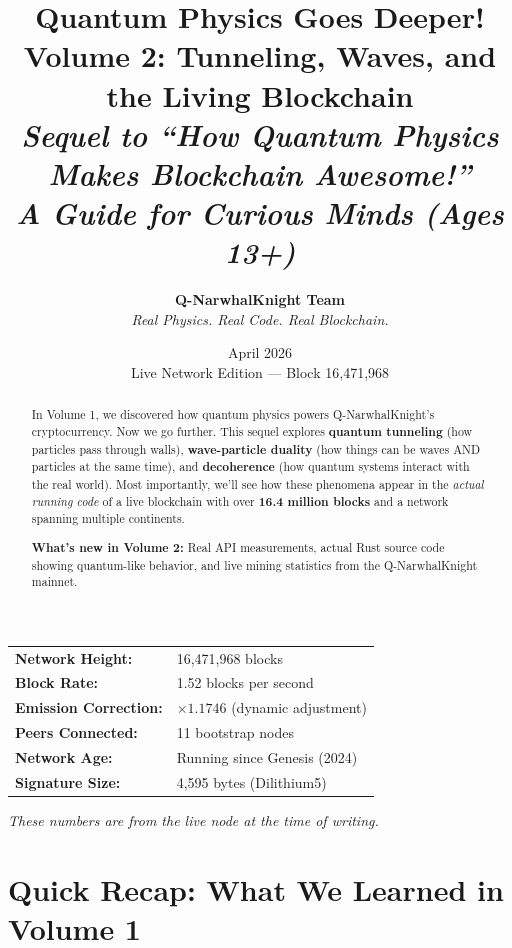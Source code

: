 \documentclass[11pt,a4paper]{article}
\title{\textbf{\Huge Quantum Physics Goes Deeper!}\\
\vspace{0.3cm}
{\Large Volume 2: Tunneling, Waves, and the Living Blockchain}\\
\vspace{0.3cm}
{\normalsize \textit{Sequel to ``How Quantum Physics Makes Blockchain Awesome!''}}\\
\vspace{0.5cm}
{\large \textit{A Guide for Curious Minds (Ages 13+)}}}
\author{
\textbf{Q-NarwhalKnight Team}\\
\textit{Real Physics. Real Code. Real Blockchain.}
}
\date{April 2026\\Live Network Edition — Block 16,471,968}
\begin{document}
\maketitle

\begin{abstract}
\large
In Volume 1, we discovered how quantum physics powers Q-NarwhalKnight's cryptocurrency. Now we go further. This sequel explores \textbf{quantum tunneling} (how particles pass through walls), \textbf{wave-particle duality} (how things can be waves AND particles at the same time), and \textbf{decoherence} (how quantum systems interact with the real world). Most importantly, we'll see how these phenomena appear in the \textit{actual running code} of a live blockchain with over \textbf{16.4 million blocks} and a network spanning multiple continents.

\textbf{What's new in Volume 2:} Real API measurements, actual Rust source code showing quantum-like behavior, and live mining statistics from the Q-NarwhalKnight mainnet.
\end{abstract}

\begin{tcolorbox}[colback=coolblue!10,colframe=coolblue,title=\textbf{Live Network Snapshot (April 2026)}]
\begin{center}
\begin{tabular}{ll}
\textbf{Network Height:} & 16,471,968 blocks \\
\textbf{Block Rate:} & 1.52 blocks per second \\
\textbf{Emission Correction:} & $\times 1.1746$ (dynamic adjustment) \\
\textbf{Peers Connected:} & 11 bootstrap nodes \\
\textbf{Network Age:} & Running since Genesis (2024) \\
\textbf{Signature Size:} & 4,595 bytes (Dilithium5) \\
\end{tabular}
\end{center}
\textit{These numbers are from the live node at the time of writing.}
\end{tcolorbox}

\newpage
\tableofcontents
\newpage

\section{Quick Recap: What We Learned in Volume 1}
\end{document}
